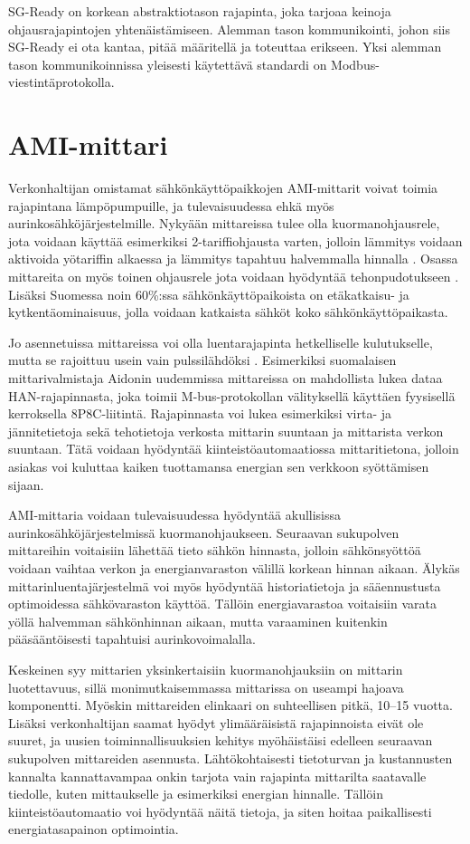   SG-Ready on korkean abstraktiotason rajapinta, joka tarjoaa keinoja ohjausrajapintojen yhtenäistämiseen. Alemman tason kommunikointi, johon siis SG-Ready ei ota kantaa, pitää määritellä ja toteuttaa erikseen. Yksi alemman tason kommunikoinnissa yleisesti käytettävä standardi on Modbus-viestintäprotokolla.

\section{AMI-mittari}
  Verkonhaltijan omistamat sähkönkäyttöpaikkojen AMI-mittarit voivat toimia rajapintana lämpöpumpuille, ja tulevaisuudessa ehkä myös aurinkosähköjärjestelmille. Nykyään mittareissa tulee olla kuormanohjausrele, jota voidaan käyttää esimerkiksi 2-tariffiohjausta varten, jolloin lämmitys voidaan aktivoida yötariffin alkaessa ja lämmitys tapahtuu halvemmalla hinnalla \parencite{mittariAsetus}. Osassa mittareita on myös toinen ohjausrele jota voidaan hyödyntää tehonpudotukseen \parencite{kysJousto}. Lisäksi Suomessa noin 60\%:ssa sähkönkäyttöpaikoista on etäkatkaisu- ja kytkentäominaisuus, jolla voidaan katkaista sähköt koko sähkönkäyttöpaikasta. \parencite{AMRNykytila}

  Jo asennetuissa mittareissa voi olla luentarajapinta hetkelliselle kulutukselle, mutta se rajoittuu usein vain pulssilähdöksi \parencite{Aidon5510}. Esimerkiksi suomalaisen mittarivalmistaja Aidonin uudemmissa mittareissa on mahdollista lukea dataa \gls{HAN}-rajapinnasta, joka toimii M-bus-protokollan välityksellä käyttäen fyysisellä kerroksella \gls{8P8C}-liitintä. Rajapinnasta voi lukea esimerkiksi virta- ja jännitetietoja sekä tehotietoja verkosta mittarin suuntaan ja mittarista verkon suuntaan. \parencite{HAN, NVEHAN} Tätä voidaan hyödyntää kiinteistöautomaatiossa mittaritietona, jolloin asiakas voi kuluttaa kaiken tuottamansa energian sen verkkoon syöttämisen sijaan.

  AMI-mittaria voidaan tulevaisuudessa hyödyntää akullisissa aurinkosähköjärjestelmissä kuormanohjaukseen. Seuraavan sukupolven mittareihin voitaisiin lähettää tieto sähkön hinnasta, jolloin sähkönsyöttöä voidaan vaihtaa verkon ja energianvaraston välillä korkean hinnan aikaan. Älykäs mittarinluentajärjestelmä voi myös hyödyntää historiatietoja ja sääennustusta optimoidessa sähkövaraston käyttöä. Tällöin energiavarastoa voitaisiin varata yöllä halvemman sähkönhinnan aikaan, mutta varaaminen kuitenkin pääsääntöisesti tapahtuisi aurinkovoimalalla. \parencite{AMRNykytila}

  Keskeinen syy mittarien yksinkertaisiin kuormanohjauksiin on mittarin luotettavuus, sillä monimutkaisemmassa mittarissa on useampi hajoava komponentti. Myöskin mittareiden elinkaari on suhteellisen pitkä, 10--15 vuotta. Lisäksi verkonhaltijan saamat hyödyt ylimääräisistä rajapinnoista eivät ole suuret, ja uusien toiminnallisuuksien kehitys myöhäistäisi edelleen seuraavan sukupolven mittareiden asennusta. Lähtökohtaisesti tietoturvan ja kustannusten kannalta kannattavampaa onkin tarjota vain rajapinta mittarilta saatavalle tiedolle, kuten mittaukselle ja esimerkiksi energian hinnalle. Tällöin kiinteistöautomaatio voi hyödyntää näitä tietoja, ja siten hoitaa paikallisesti energiatasapainon optimointia.
